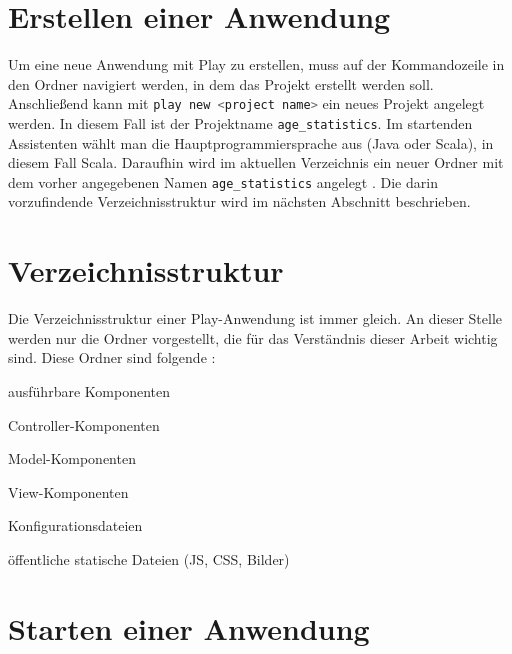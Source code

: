 \section{Erstellen einer Anwendung} %
\label{sec:erstellen_einer_anwendung}

Um eine neue Anwendung mit Play zu erstellen, muss auf der Kommandozeile in den Ordner navigiert werden, in dem das Projekt erstellt werden soll.
Anschließend kann mit \lstinline[language=sh]|play new <project name>| ein neues Projekt angelegt werden.
In diesem Fall ist der Projektname \lstinline|age_statistics|.
Im startenden Assistenten wählt man die Hauptprogrammiersprache aus (Java oder Scala), in diesem Fall Scala.
Daraufhin wird im aktuellen Verzeichnis ein neuer Ordner mit dem vorher angegebenen Namen \lstinline|age_statistics| angelegt \cite[vgl.][S.~10]{play_for_scala_v8}.
Die darin vorzufindende Verzeichnisstruktur wird im nächsten Abschnitt beschrieben.



\section{Verzeichnisstruktur} %
\label{sec:verzeichnisstruktur}

Die Verzeichnisstruktur einer Play-Anwendung ist immer gleich.
An dieser Stelle werden nur die Ordner vorgestellt, die für das Verständnis dieser Arbeit wichtig sind.
Diese Ordner sind folgende \cite[vgl.][]{play_verzeichnisstruktur}:

\begin{description}[leftmargin=!,labelwidth=\widthof{\bfseries app/controllers/}]
  \item[app/] ausführbare Komponenten
  \item[app/controllers/] Controller-Komponenten
  \item[app/models/] Model-Komponenten
  \item[app/views/] View-Komponenten
  \item[conf/] Konfigurationsdateien
  \item[public/] öffentliche statische Dateien (JS, CSS, Bilder)
\end{description}



\section{Starten einer Anwendung} %
\label{sec:starten_einer_anwendung}

